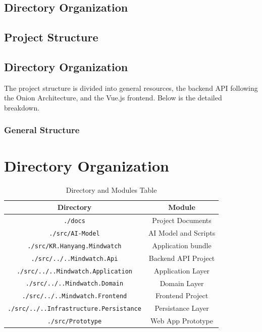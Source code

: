 \documentclass[conference]{IEEEtran}
\begin{document}
        \subsection{Directory Organization}
            
            \subsection{Project Structure}

                \subsection{Directory Organization}

                    The project structure is divided into general resources, the backend API following the Onion Architecture, and the Vue.js frontend. Below is the detailed breakdown.
                    
                    \subsubsection{General Structure}
                    
   \section{Directory Organization}

        \begin{table}
            \centering
            \renewcommand{\arraystretch}{1.5}
            \begin{tabular}{cc}
                \hline
                \textbf{Directory} & \textbf{Module} \\
                \hline
                \texttt{./docs} & Project Documents\\
                \texttt{./src/AI-Model} & AI Model and Scripts \\
                \texttt{./src/KR.Hanyang.Mindwatch} & Application bundle \\
                \texttt{./src/../..Mindwatch.Api} & Backend API Project \\
                \texttt{./src/../..Mindwatch.Application} & Application Layer \\
                \texttt{./src/../..Mindwatch.Domain} & Domain Layer \\
                \texttt{./src/../..Mindwatch.Frontend} & Frontend Project \\
                \texttt{./src/../..Infrastructure.Persistance} & Persistance Layer \\
                \texttt{./src/Prototype} & Web App Prototype \\
            \end{tabular}
            \caption{Directory and Modules Table}
            \label{tab:my_label}
        \end{table}
                
\end{document}
